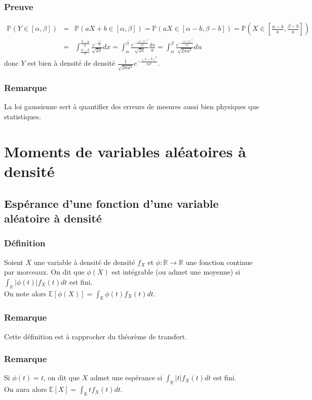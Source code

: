 \documentclass[a4paper,10pt]{book} %
\newcommand{\R}{\mathbb{R}}
\newcommand{\E}{\mathbb{E}} %
\renewcommand{\P}{\mathbb{P}} %
\newcommand\abs[1]{\left|#1\right|}
\begin{document}
\subsubsection{Preuve}
$\begin{array}{rcl}\displaystyle \P(Y\in [\alpha, \beta]) &=& \displaystyle \P(aX+b\in [\alpha,\beta]) = \P(aX\in [\alpha-b,\beta-b]) = \P(X\in [\frac{\alpha-b}{a},\frac{\beta-b}{a}]) \\ &=&\displaystyle \int_{\frac{\alpha-b}{a}}^{\frac{\beta-b}{a}}\frac{e^{-\frac{x^2}{2}}}{\sqrt{2\pi}}dx=\int_\alpha^\beta\frac{e^{-\frac{(u-b)^2}{2a^2}}}{\sqrt{2\pi}}\frac{du}{a} = \int_\alpha^\beta \frac{e^{-\frac{(u-b)^2}{2a^2}}}{\sqrt{2\pi a^2}}du\end{array}$\\
donc $Y$ est bien à densité de densité $\displaystyle \frac{1}{\sqrt{2\pi a^2}}e^{-\frac{(x-b)^2}{2a^2}}$.

\subsubsection{Remarque}
La loi gaussienne sert à quantifier des erreurs de mesures aussi bien physiques que statistiques.

\section{Moments de variables aléatoires à densité}
\subsection{Espérance d'une fonction d'une variable aléatoire à densité}
\subsubsection{Définition}
Soient $X$ une variable à densité de densité $f_X$ et $\phi : \R\rightarrow \R$ une fonction continue par morceaux. On dit que $\phi(X)$ est intégrable (ou admet une moyenne) si $\displaystyle \int_\R \abs{\phi(t)}f_X(t)dt$ est fini.\\
On note alors $\displaystyle \E[\phi(X)]=\int_\R \phi(t)f_X(t)dt$.

\subsubsection{Remarque}
Cette définition est à rapprocher du théorème de transfert.

\subsubsection{Remarque}
Si $\phi(t)=t$, on dit que $X$ admet une espérance si $\displaystyle \int_\R \abs{t}f_X(t)dt$ est fini.\\
On aura alors $\displaystyle \E[X]=\int_\R tf_X(t)dt$.
\end{document}
